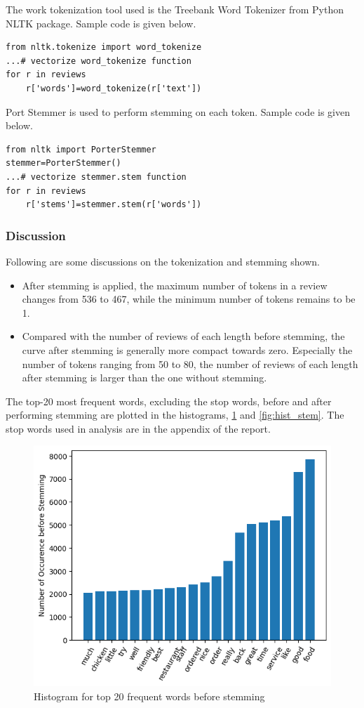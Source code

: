\documentclass[sigconf]{acmart}
\begin{document}
The work tokenization tool used is the Treebank Word Tokenizer from Python NLTK package. Sample code is given below.
\begin{verbatim}
from nltk.tokenize import word_tokenize
...# vectorize word_tokenize function
for r in reviews
    r['words']=word_tokenize(r['text'])
\end{verbatim}

Port Stemmer is used to perform stemming on each token. Sample code is given below.
\begin{verbatim}
from nltk import PorterStemmer
stemmer=PorterStemmer()
...# vectorize stemmer.stem function
for r in reviews
    r['stems']=stemmer.stem(r['words'])
\end{verbatim}

\subsubsection{Discussion} Following are some discussions on the tokenization and stemming shown.
\begin{itemize}
\item After stemming is applied, the maximum number of tokens in a review changes from 536 to 467, while the minimum number of tokens remains to be 1.
\item Compared with the number of reviews of each length before stemming, the curve after stemming is generally more compact towards zero. Especially the number of tokens ranging from 50 to 80, the number of reviews of each length after stemming is larger than the one without stemming.
\end{itemize}

The top-20 most frequent words, excluding the stop words, before and after performing stemming are plotted in the histograms, \ref{fig:hist_token} and \ref{fig:hist_stem}. The stop words used in analysis are in the appendix of the report.

\begin{figure}[ht]
  \centering
  \includegraphics[width=\linewidth]{frequent_token.png}
  \caption{Histogram for top 20 frequent words before stemming}
  \label{fig:hist_token}
\end{figure}
\end{document}
